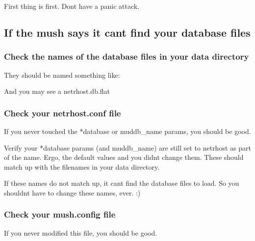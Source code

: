 \documentclass[letterpaper,10pt,english]{sphinxmanual}
\begin{document}
\sphinxAtStartPar
First thing is first.  Don\textquotesingle{}t have a panic attack.


\subsection{If the mush says it can\textquotesingle{}t find your database files}
\label{\detokenize{troubleshooting:if-the-mush-says-it-can-t-find-your-database-files}}

\subsubsection{Check the names of the database files in your \textquotesingle{}data\textquotesingle{} directory}
\label{\detokenize{troubleshooting:check-the-names-of-the-database-files-in-your-data-directory}}
\sphinxAtStartPar
They should be named something like:

\begin{sphinxVerbatim}[commandchars=\\\{\}]
\end{sphinxVerbatim}

\sphinxAtStartPar
And you may see a netrhost.db.flat


\subsubsection{Check your netrhost.conf file}
\label{\detokenize{troubleshooting:check-your-netrhost-conf-file}}
\sphinxAtStartPar
If you never touched the *database or muddb\_name params, you should be good.

\sphinxAtStartPar
Verify your *database params (and muddb\_name) are still set to \textquotesingle{}netrhost\textquotesingle{} as
part of the name.  Ergo, the default values and you didn\textquotesingle{}t change them.
These should match up with the filenames in your data directory.

\sphinxAtStartPar
If these names do not match up, it can\textquotesingle{}t find the database files to load.
So you shouldn\textquotesingle{}t have to change these names, ever. :)


\subsubsection{Check your mush.config file}
\label{\detokenize{troubleshooting:check-your-mush-config-file}}
\sphinxAtStartPar
If you never modified this file, you should be good.
\end{document}
